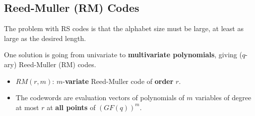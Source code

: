 \documentclass[11pt]{article}
\begin{document}
\subsection{Reed-Muller (RM) Codes}
The problem with RS codes is that the alphabet size must be large, at least as large as the desired length.

One solution is going from univariate to \textbf{multivariate polynomials}, giving ($q$-ary) Reed-Muller (RM) codes.

\begin{itemize}
  \item $RM(r, m)$: $m$-\textbf{variate} Reed-Muller code of \textbf{order} $r$.
  \item The codewords are evaluation vectors of polynomials of $m$ variables of degree at most $r$ at \textbf{all points} of $(GF(q))^m$.
\end{itemize}
\end{document}
